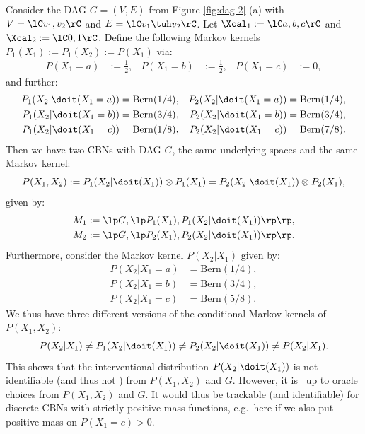 \begin{Eg}
    Consider the DAG $G=(V,E)$ from Figure \ref{fig:dag-2} (a) with $V=\lC v_1,v_2 \rC$ and $E=\lC v_1\tuh v_2 \rC$.
    Let $\Xcal_{1}:=\lC a,b,c\rC$ and $\Xcal_{2}:=\lC 0,1 \rC$.
    Define the following Markov kernels $P_1(X_{1}) := P_1(X_{2}):=P(X_{1})$ via:
    \begin{align*}
        P(X_{1}=a) &:= \frac{1}{2}, &P(X_{1}=b) &:= \frac{1}{2}, & P(X_{1}=c) &:= 0,
    \end{align*}
    and further:
   \begin{align*}
        P_1(X_{2}|\doit(X_{1}=a)) & =  \mathrm{Bern}(1/4), & P_2(X_{2}|\doit(X_{1}=a)) & =  \mathrm{Bern}(1/4), \\
        P_1(X_{2}|\doit(X_{1}=b)) & =  \mathrm{Bern}(3/4), & P_2(X_{2}|\doit(X_{1}=b)) & =  \mathrm{Bern}(3/4), \\
        P_1(X_{2}|\doit(X_{1}=c)) & =  \mathrm{Bern}(1/8), & P_2(X_{2}|\doit(X_{1}=c)) & =  \mathrm{Bern}(7/8).
    \end{align*}
    Then we have two CBNs with \observational DAG $G$, the same underlying spaces 
    and the same \observational Markov kernel: 
    \[ P(X_{1},X_{2}) := P_1(X_{2}|\doit(X_{1})) \otimes P_1(X_{1}) = P_2(X_{2}|\doit(X_{1})) \otimes P_2(X_{1}), \]
    given by:
\begin{align*} M_1:=\lp G, \lp P_1(X_{1}),P_1(X_{2}|\doit(X_{1})) \rp \rp, \\
               M_2:=\lp G, \lp P_2(X_{1}),P_2(X_{2}|\doit(X_{1})) \rp \rp. 
\end{align*}
    Furthermore, consider the Markov kernel $P(X_{2}|X_{1})$ given by:
   \begin{align*}
        P(X_{2}|X_{1}=a) & =  \mathrm{Bern}(1/4),\\
        P(X_{2}|X_{1}=b) & =  \mathrm{Bern}(3/4), \\
        P(X_{2}|X_{1}=c) & =  \mathrm{Bern}(5/8).
    \end{align*}
    We thus have three different versions of the conditional Markov kernels of $P(X_{1},X_{2})$: 
 \[ P(X_{2}|X_{1}) \neq P_1(X_{2}|\doit(X_{1})) \neq P_2(X_{2}|\doit(X_{1})) \neq P(X_{2}|X_{1}). \]
 This shows that the interventional distribution $P(X_{2}|\doit(X_{1}))$ is not identifiable (and thus not \trackable) from $P(X_{1},X_{2})$ and  $G$.
 However, it is  \trackable\ up to oracle choices from $P(X_{1},X_{2})$ and $G$.
 It would thus be trackable (and identifiable) for discrete CBNs with strictly positive mass functions, e.g.\ here if
 we also put positive mass on $P(X_{1}=c) > 0$.
\end{Eg}


